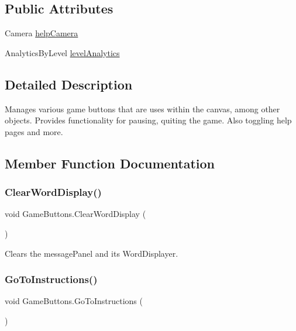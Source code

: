 \subsection*{Public Attributes}
\begin{DoxyCompactItemize}
\item 
Camera \hyperlink{class_game_buttons_a2209c4c549e16c9c815b1c0a3a15bbbd}{help\+Camera}
\item 
Analytics\+By\+Level \hyperlink{class_game_buttons_a1d1a3181b45c9bd292fa2490acb742c2}{level\+Analytics}
\end{DoxyCompactItemize}


\subsection{Detailed Description}
Manages various game buttons that are uses within the canvas, among other objects. Provides functionality for pausing, quiting the game. Also toggling help pages and more. 

\subsection{Member Function Documentation}
\mbox{\label{class_game_buttons_aa55857210a186acda2b262d2cab348b8}} 
\subsubsection{\texorpdfstring{Clear\+Word\+Display()}{ClearWordDisplay()}}
{\footnotesize\ttfamily void Game\+Buttons.\+Clear\+Word\+Display (\begin{DoxyParamCaption}{ }\end{DoxyParamCaption})}



Clears the message\+Panel and it\textquotesingle{}s Word\+Displayer. 

\mbox{\label{class_game_buttons_ac91982c8a1409e977ceb47220fd7112a}} 
\subsubsection{\texorpdfstring{Go\+To\+Instructions()}{GoToInstructions()}}
{\footnotesize\ttfamily void Game\+Buttons.\+Go\+To\+Instructions (\begin{DoxyParamCaption}{ }\end{DoxyParamCaption})}

